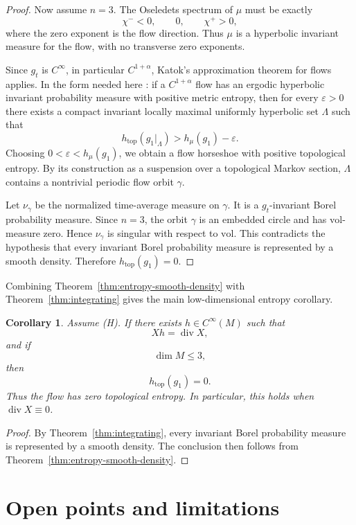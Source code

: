\documentclass[12pt]{article}
\newtheorem{corollary}[theorem]{Corollary}
\theoremstyle{definition}
\newcommand{\vol}{\mathrm{vol}}
\DeclareMathOperator{\Div}{div}
\begin{document}
\begin{proof}
Now assume \(n=3\).  The Oseledets spectrum of \(\mu\) must be exactly
\[
\chi^-<0,\qquad 0,\qquad \chi^+>0,
\]
where the zero exponent is the flow direction.  Thus \(\mu\) is a hyperbolic invariant measure for the flow, with no transverse zero exponents.

Since \(g_t\) is \(C^\infty\), in particular \(C^{1+\alpha}\), Katok's approximation theorem for flows applies.  In the form needed here \cite[Section 4]{Kat82}: if a \(C^{1+\alpha}\) flow has an ergodic hyperbolic invariant probability measure with positive metric entropy, then for every \(\varepsilon>0\) there exists a compact invariant locally maximal uniformly hyperbolic set \(\Lambda\) such that
\[
h_{\mathrm{top}}(g_1|_\Lambda)>h_\mu(g_1)-\varepsilon .
\]
Choosing \(0<\varepsilon<h_\mu(g_1)\), we obtain a flow horseshoe with positive topological entropy.  By its construction as a suspension over a topological Markov section, \(\Lambda\) contains a nontrivial periodic flow orbit \(\gamma\).

Let \(\nu_\gamma\) be the normalized time-average measure on \(\gamma\).  It is a \(g_t\)-invariant Borel probability measure.  Since \(n=3\), the orbit \(\gamma\) is an embedded circle and has \(\vol\)-measure zero.  Hence \(\nu_\gamma\) is singular with respect to \(\vol\).  This contradicts the hypothesis that every invariant Borel probability measure is represented by a smooth density.  Therefore \(h_{\mathrm{top}}(g_1)=0\).
\end{proof}

Combining Theorem~\ref{thm:entropy-smooth-density} with Theorem~\ref{thm:integrating} gives the main low-dimensional entropy corollary.

\begin{corollary}\label{cor:integrating-entropy}
Assume (H).  If there exists \(h\in C^\infty(M)\) such that
\[
Xh=\Div X,
\]
and if
\[
\dim M\le 3,
\]
then
\[
h_{\mathrm{top}}(g_1)=0.
\]
Thus the flow has zero topological entropy.  In particular, this holds when \(\Div X\equiv 0\).
\end{corollary}

\begin{proof}
By Theorem~\ref{thm:integrating}, every invariant Borel probability measure is represented by a smooth density.  The conclusion then follows from Theorem~\ref{thm:entropy-smooth-density}.
\end{proof}

\section{Open points and limitations}
\label{sec:open}
\end{document}
